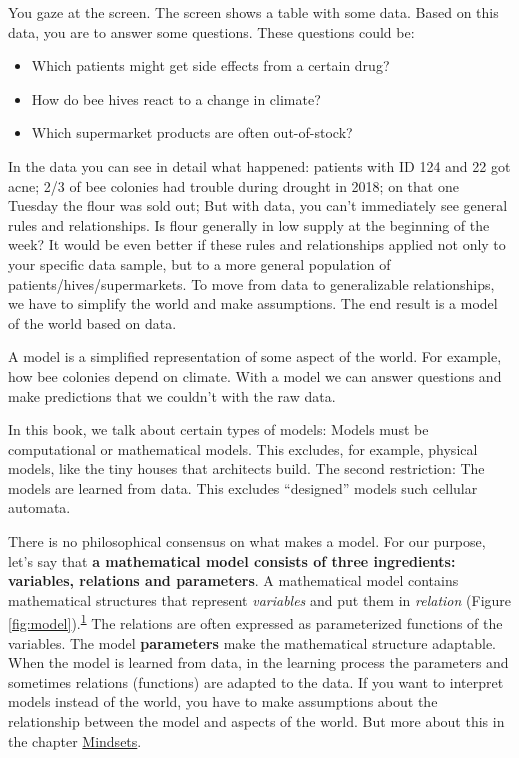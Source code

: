\documentclass[
  10pt,
]{scrbook}
\providecommand{\tightlist}{%
  \setlength{\itemsep}{0pt}\setlength{\parskip}{0pt}}
\begin{document}
You gaze at the screen.
The screen shows a table with some data.
Based on this data, you are to answer some questions.
These questions could be:

\begin{itemize}
\tightlist
\item
  Which patients might get side effects from a certain drug?
\item
  How do bee hives react to a change in climate?
\item
  Which supermarket products are often out-of-stock?
\end{itemize}

In the data you can see in detail what happened: patients with ID 124 and 22 got acne; 2/3 of bee colonies had trouble during drought in 2018; on that one Tuesday the flour was sold out;
But with data, you can't immediately see general rules and relationships.
Is flour generally in low supply at the beginning of the week?
It would be even better if these rules and relationships applied not only to your specific data sample, but to a more general population of patients/hives/supermarkets.
To move from data to generalizable relationships, we have to simplify the world and make assumptions.
The end result is a model of the world based on data.

A model is a simplified representation of some aspect of the world.
For example, how bee colonies depend on climate.
With a model we can answer questions and make predictions that we couldn't with the raw data.

In this book, we talk about certain types of models:
Models must be computational or mathematical models.
This excludes, for example, physical models, like the tiny houses that architects build.
The second restriction: The models are learned from data.
This excludes ``designed'' models such cellular automata.

There is no philosophical consensus on what makes a model.
For our purpose, let's say that \textbf{a mathematical model consists of three ingredients: variables, relations and parameters}.
A mathematical model contains mathematical structures that represent \emph{variables} and put them in \emph{relation} (Figure \ref{fig:model}).\textsuperscript{\protect\hyperlink{ref-weisberg2012simulation}{1}}
The relations are often expressed as parameterized functions of the variables.
The model \textbf{parameters} make the mathematical structure adaptable.
When the model is learned from data, in the learning process the parameters and sometimes relations (functions) are adapted to the data.
If you want to interpret models instead of the world, you have to make assumptions about the relationship between the model and aspects of the world.
But more about this in the chapter \protect\hyperlink{mindsets}{Mindsets}.
\end{document}
